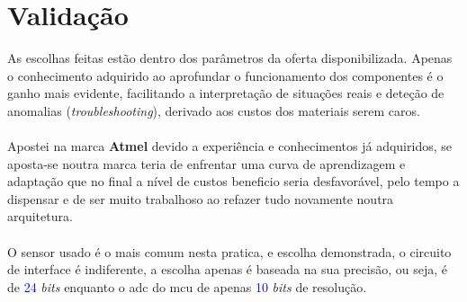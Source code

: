 \section{Validação}
As escolhas feitas estão dentro dos parâmetros da oferta disponibilizada. Apenas o conhecimento adquirido ao aprofundar o funcionamento dos componentes é o ganho mais evidente, facilitando a interpretação de situações reais e deteção de anomalias (\textit{troubleshooting}), derivado aos custos dos materiais serem caros.
\\
\\
Apostei na marca \textbf{Atmel} devido a experiência e conhecimentos já adquiridos, se aposta-se noutra marca teria de enfrentar uma curva de aprendizagem e adaptação que no final a nível de custos beneficio seria desfavorável, pelo tempo a dispensar e de ser muito trabalhoso ao refazer tudo novamente noutra arquitetura.
\\
\\
O sensor usado é o mais comum nesta pratica, e escolha demonstrada, o circuito de interface é indiferente, a escolha apenas é baseada na sua precisão, ou seja, é de \textcolor{blue}{24} \textit{bits} enquanto o \acs{adc} do \acs{mcu} de apenas \textcolor{blue}{10} \textit{bits} de resolução.
\\
\\
